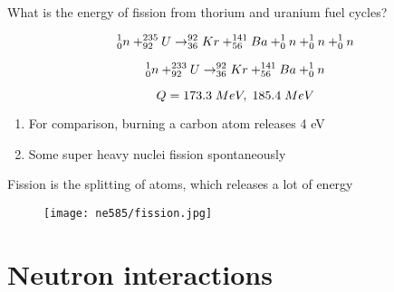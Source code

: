 \documentclass[aspectratio=1610,pdftex,dvipsnames,compress,xcolor={dvipsnames}]{beamer}
\begin{document}
\addtocounter{framenumber}{-1} 
\begin{frame}{What is the energy of fission from thorium and uranium fuel cycles?}

    \begin{equation}
        \LARGE
        ^1_0n + ^{235}_{92}U \rightarrow ^{92}_{36}Kr + ^{141}_{56}Ba + ^1_0n + ^1_0n + ^1_0n  
    \end{equation}

    \begin{equation}
        \LARGE
        ^1_0n + ^{233}_{92}U \rightarrow ^{92}_{36}Kr + ^{141}_{56}Ba + ^1_0n   
    \end{equation}

    \begin{equation}
        \LARGE
        Q = 173.3 \; MeV, \; 185.4 \; MeV
    \end{equation}

    \vspace*{\fill}

    \begin{enumerate}[series=outerlist,topsep=0pt,itemsep=21pt,leftmargin=*,label=(\arabic*)]
        \item[]For comparison, burning a carbon atom releases 4 eV
        \item[]Some super heavy nuclei fission spontaneously
    \end{enumerate}
\end{frame}


\begin{frame}{Fission is the splitting of atoms, which releases a lot of energy}
    \begin{figure}
        \centering
        \texttt{[image: ne585/fission.jpg]}
    \end{figure}
\end{frame}


\section{Neutron interactions}
\end{document}
